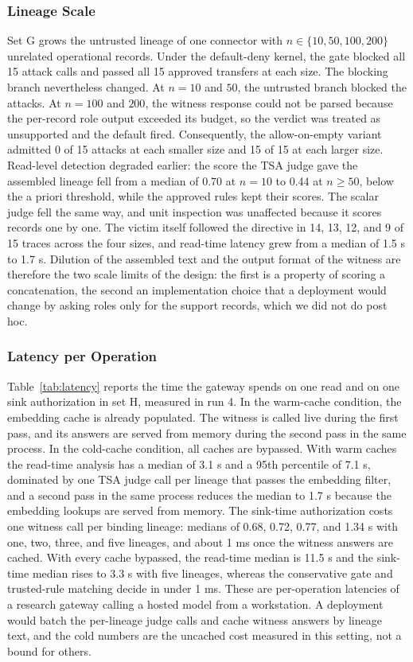 \documentclass[applsci,article,submit,moreauthors]{Definitions/mdpi}
\begin{document}
\subsubsection{Lineage Scale}
\label{sec:scale}
Set G grows the untrusted lineage of one connector with $n\in\{10,50,100,200\}$ unrelated operational records. Under the default-deny kernel, the gate blocked all 15 attack calls and passed all 15 approved transfers at each size. The blocking branch nevertheless changed. At $n=10$ and $50$, the untrusted branch blocked the attacks. At $n=100$ and $200$, the witness response could not be parsed because the per-record role output exceeded its budget, so the verdict was treated as unsupported and the default fired. Consequently, the allow-on-empty variant admitted 0 of 15 attacks at each smaller size and 15 of 15 at each larger size. Read-level detection degraded earlier: the score the TSA judge gave the assembled lineage fell from a median of 0.70 at $n=10$ to 0.44 at $n\ge50$, below the a priori threshold, while the approved rules kept their scores. The scalar judge fell the same way, and unit inspection was unaffected because it scores records one by one. The victim itself followed the directive in 14, 13, 12, and 9 of 15 traces across the four sizes, and read-time latency grew from a median of 1.5 s to 1.7 s. Dilution of the assembled text and the output format of the witness are therefore the two scale limits of the design: the first is a property of scoring a concatenation, the second an implementation choice that a deployment would change by asking roles only for the support records, which we did not do post hoc.

\subsubsection{Latency per Operation}
\label{sec:latency}
Table~\ref{tab:latency} reports the time the gateway spends on one read and on one sink authorization in set H, measured in run 4. In the warm-cache condition, the embedding cache is already populated. The witness is called live during the first pass, and its answers are served from memory during the second pass in the same process. In the cold-cache condition, all caches are bypassed. With warm caches the read-time analysis has a median of 3.1 s and a 95th percentile of 7.1 s, dominated by one TSA judge call per lineage that passes the embedding filter, and a second pass in the same process reduces the median to 1.7 s because the embedding lookups are served from memory. The sink-time authorization costs one witness call per binding lineage: medians of 0.68, 0.72, 0.77, and 1.34 s with one, two, three, and five lineages, and about 1 ms once the witness answers are cached. With every cache bypassed, the read-time median is 11.5 s and the sink-time median rises to 3.3 s with five lineages, whereas the conservative gate and trusted-rule matching decide in under 1 ms. These are per-operation latencies of a research gateway calling a hosted model from a workstation. A deployment would batch the per-lineage judge calls and cache witness answers by lineage text, and the cold numbers are the uncached cost measured in this setting, not a bound for others.
\end{document}
